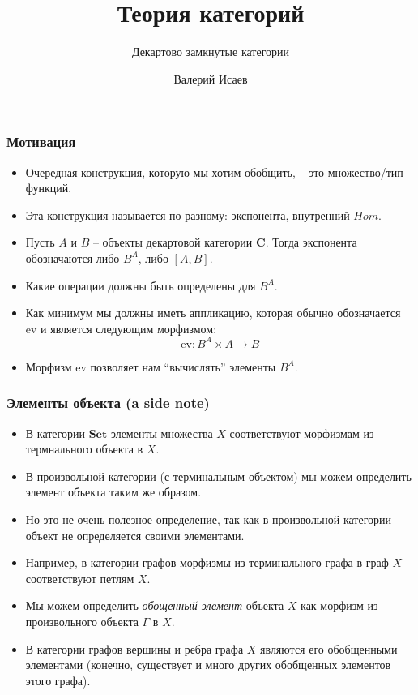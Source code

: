 \documentclass{beamer}
\theoremstyle{definition}
\newcommand{\cat}[1]{\mathbf{#1}}
\renewcommand{\C}{\cat{C}}
\newcommand{\Set}{\cat{Set}}
\newcommand{\ev}{\mathrm{ev}}
\begin{document}
\title{Теория категорий}
\subtitle{Декартово замкнутые категории}
\author{Валерий Исаев}
\maketitle

\begin{frame}
\frametitle{Мотивация}
\begin{itemize}
\item Очередная конструкция, которую мы хотим обобщить, -- это множество/тип функций.
\item Эта конструкция называется по разному: экспонента, внутренний $Hom$.
\item Пусть $A$ и $B$ -- объекты декартовой категории $\C$. Тогда экспонента обозначаются либо $B^A$, либо $[A,B]$.
\item Какие операции должны быть определены для $B^A$.
\item Как минимум мы должны иметь аппликацию, которая обычно обозначается $\ev$ и является следующим морфизмом:
\[ \ev : B^A \times A \to B \]
\item Морфизм $\ev$ позволяет нам ``вычислять'' элементы $B^A$.
\end{itemize}
\end{frame}

\begin{frame}
\frametitle{Элементы объекта (a side note)}
\begin{itemize}
\item В категории $\Set$ элементы множества $X$ соответствуют морфизмам из термнального объекта в $X$.
\item В произвольной категории (с терминальным объектом) мы можем определить элемент объекта таким же образом.
\item Но это не очень полезное определение, так как в произвольной категории объект не определяется своими элементами.
\item Например, в категории графов морфизмы из терминального графа в граф $X$ соответствуют петлям $X$.
\item Мы можем определить \emph{обощенный элемент} объекта $X$ как морфизм из произвольного объекта $\Gamma$ в $X$.
\item В категории графов вершины и ребра графа $X$ являются его обобщенными элементами (конечно, существует и много других обобщенных элементов этого графа).
\end{itemize}
\end{frame}
\end{document}
